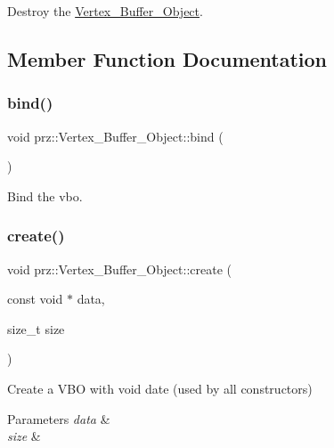 Destroy the \mbox{\hyperlink{classprz_1_1_vertex___buffer___object}{Vertex\+\_\+\+Buffer\+\_\+\+Object}}. 



\subsection{Member Function Documentation}
\mbox{\label{classprz_1_1_vertex___buffer___object_af331ffa3037d9439ce128edb2aa68283}} 
\subsubsection{\texorpdfstring{bind()}{bind()}}
{\footnotesize\ttfamily void prz\+::\+Vertex\+\_\+\+Buffer\+\_\+\+Object\+::bind (\begin{DoxyParamCaption}{ }\end{DoxyParamCaption})\hspace{0.3cm}{\ttfamily [inline]}}



Bind the vbo. 

\mbox{\label{classprz_1_1_vertex___buffer___object_ae49ebbeffd4601e6d4323a0f0cdec07c}} 
\subsubsection{\texorpdfstring{create()}{create()}}
{\footnotesize\ttfamily void prz\+::\+Vertex\+\_\+\+Buffer\+\_\+\+Object\+::create (\begin{DoxyParamCaption}\item[{const void $\ast$}]{data,  }\item[{size\+\_\+t}]{size }\end{DoxyParamCaption})}



Create a V\+BO with void date (used by all constructors) 


\begin{DoxyParams}{Parameters}
{\em data} & \\
\hline
{\em size} & \\
\hline
\end{DoxyParams}
\mbox{\label{classprz_1_1_vertex___buffer___object_a8a8a3fbc56e01dafa1fe8828dfca3e5b}} 
